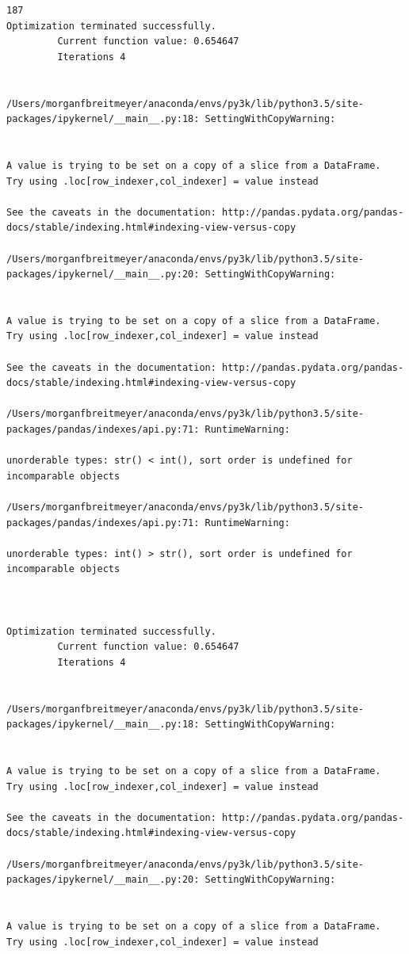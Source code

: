 \begin{lstlisting}
187
Optimization terminated successfully.
         Current function value: 0.654647
         Iterations 4


/Users/morganfbreitmeyer/anaconda/envs/py3k/lib/python3.5/site-packages/ipykernel/__main__.py:18: SettingWithCopyWarning:


A value is trying to be set on a copy of a slice from a DataFrame.
Try using .loc[row_indexer,col_indexer] = value instead

See the caveats in the documentation: http://pandas.pydata.org/pandas-docs/stable/indexing.html#indexing-view-versus-copy

/Users/morganfbreitmeyer/anaconda/envs/py3k/lib/python3.5/site-packages/ipykernel/__main__.py:20: SettingWithCopyWarning:


A value is trying to be set on a copy of a slice from a DataFrame.
Try using .loc[row_indexer,col_indexer] = value instead

See the caveats in the documentation: http://pandas.pydata.org/pandas-docs/stable/indexing.html#indexing-view-versus-copy

/Users/morganfbreitmeyer/anaconda/envs/py3k/lib/python3.5/site-packages/pandas/indexes/api.py:71: RuntimeWarning:

unorderable types: str() < int(), sort order is undefined for incomparable objects

/Users/morganfbreitmeyer/anaconda/envs/py3k/lib/python3.5/site-packages/pandas/indexes/api.py:71: RuntimeWarning:

unorderable types: int() > str(), sort order is undefined for incomparable objects



Optimization terminated successfully.
         Current function value: 0.654647
         Iterations 4


/Users/morganfbreitmeyer/anaconda/envs/py3k/lib/python3.5/site-packages/ipykernel/__main__.py:18: SettingWithCopyWarning:


A value is trying to be set on a copy of a slice from a DataFrame.
Try using .loc[row_indexer,col_indexer] = value instead

See the caveats in the documentation: http://pandas.pydata.org/pandas-docs/stable/indexing.html#indexing-view-versus-copy

/Users/morganfbreitmeyer/anaconda/envs/py3k/lib/python3.5/site-packages/ipykernel/__main__.py:20: SettingWithCopyWarning:


A value is trying to be set on a copy of a slice from a DataFrame.
Try using .loc[row_indexer,col_indexer] = value instead


\end{lstlisting}
